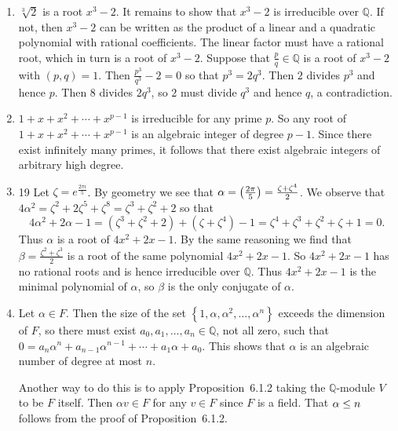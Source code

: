 \documentclass[12pt]{article}
\let\deg\relax\DeclareMathOperator{\deg}{\mathsf{deg}}
\let\cos\relax\DeclareMathOperator{\cos}{\mathsf{cos}}
\begin{document}
\begin{enumerate}
\item %
$\sqrt[3]{2}$ is a root $x^3-2$. It remains to
show that $x^3-2$ is irreducible over $\mathbb{Q}$.
If not, then $x^3-2$ can be written as the product
of a linear and a quadratic polynomial with rational coefficients.
The linear factor must have a rational root, which in turn
is a root of $x^3-2$.
Suppose that $\frac{p}{q}\in\mathbb{Q}$
is a root of $x^3-2$ with $\left(p,q\right)=1$.
Then $\frac{p^3}{q^3}-2=0$ so that $p^3=2q^3$. Then $2$
divides $p^3$ and hence $p$. Then $8$ divides $2q^3$,
so $2$ must divide $q^3$ and hence $q$, a contradiction.

\item %
$1+x+x^2+\cdots+x^{p-1}$ is irreducible for any prime $p$.
So any root of $1+x+x^2+\cdots+x^{p-1}$ is an algebraic
integer of degree $p-1$.
Since there exist infinitely many primes,
it follows that there exist algebraic integers of arbitrary
high degree.

\item 19
Let $\zeta=e^{\frac{2\pi i}{5}}$.
By geometry we see that $\alpha=\cos\left(\frac{2\pi}{5}\right)
=\frac{\zeta+\zeta^4}{2}$.
We observe that $4\alpha^2=\zeta^2+2\zeta^5+\zeta^8
=\zeta^3+\zeta^2+2$ so that
\[4\alpha^2+2\alpha-1=\left(\zeta^3+\zeta^2+2\right)+
\left(\zeta+\zeta^4\right)-1
=\zeta^4+\zeta^3+\zeta^2+\zeta+1=0.\]
Thus $\alpha$ is a root of $4x^2+2x-1$.
By the same reasoning we find that $\beta=\frac{\zeta^2+\zeta^3}{2}$
is a root of the same polynomial
$4x^2+2x-1$.
So $4x^2+2x-1$ has no rational roots and
is hence irreducible over $\mathbb{Q}$. Thus $4x^2+2x-1$
is the minimal polynomial of $\alpha$, so $\beta$ is the
only conjugate of $\alpha$.

\item %
Let $\alpha\in F$. Then the size of the set
$\left\{1,\alpha,\alpha^2,\ldots,\alpha^n\right\}$
exceeds the dimension of $F$, so there must exist
$a_0,a_1,\ldots,a_n\in\mathbb{Q}$, not all zero,
such that $0=a_n\alpha^n+a_{n-1}\alpha^{n-1}+\cdots+a_1\alpha+a_0$.
This shows that $\alpha$ is an algebraic number of degree
at most $n$.

Another way to do this is to apply Proposition~6.1.2
taking the $\mathbb{Q}$-module $V$ to be $F$ itself.
Then $\alpha v\in F$ for any $v\in F$ since $F$ is a field.
That $\deg\alpha\le n$ follows from the proof of Proposition~6.1.2.
\end{enumerate}
\end{document}

